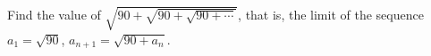 Find the value of $\sqrt{90+\sqrt{90+\sqrt{90+\cdots}}}$, that is, the limit of the sequence $a_1=\sqrt{90}$, $a_{n+1}=\sqrt{90+a_n}$.
